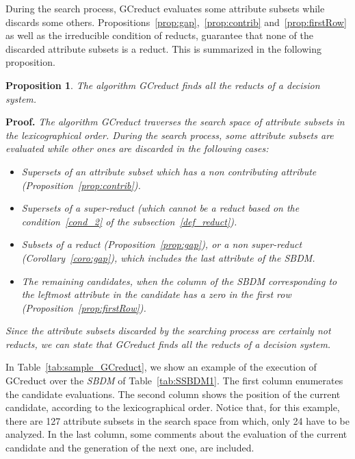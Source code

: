\documentclass[letterpaper, twoside, openright, 12pt]{book}%
\newtheorem{proposition}{Proposition}
\begin{document}
	During the search process, GCreduct evaluates some attribute subsets while discards some others. Propositions~\ref{prop:gap},~\ref{prop:contrib} and~\ref{prop:firstRow} as well as the irreducible condition of reducts, guarantee that none of the discarded attribute subsets is a reduct. This is summarized in the following proposition.
		
	\begin{proposition}\label{prop:findall}
		The algorithm GCreduct finds all the reducts of a decision system.
	\end{proposition}
		
	\noindent
	\textbf{Proof.} \textit{The algorithm GCreduct traverses the search space of attribute subsets in the lexicographical order. During the search process, some attribute subsets are evaluated while other ones are discarded in the following cases:}
		\begin{itemize}
			\item \textit{Supersets of an attribute subset which has a non contributing attribute (Proposition~\ref{prop:contrib}).}
			\item \textit{Supersets of a super-reduct (which cannot be a reduct based on the condition~\ref{cond_2} of the subsection~\ref{def_reduct}).}
			\item \textit{Subsets of a reduct (Proposition~\ref{prop:gap}), or a non super-reduct (Corollary~\ref{coro:gap}), which includes the last attribute of the \textit{SBDM}.}
			\item \textit{The remaining candidates, when the column of the \textit{SBDM} corresponding to the leftmost attribute in the candidate has a zero in the first row (Proposition~\ref{prop:firstRow}).}
		\end{itemize} 
	\textit{Since the attribute subsets discarded by the searching process are certainly not reducts, we can state that GCreduct finds all the reducts of a decision system.}
	
	In Table~\ref{tab:sample_GCreduct}, we show an example of the execution of GCreduct over the \textit{SBDM} of Table~\ref{tab:SSBDM1}. The first column enumerates the candidate evaluations. The second column shows the position of the current candidate, according to the lexicographical order. Notice that, for this example, there are 127 attribute subsets in the search space from which, only 24 have to be analyzed. In the last column, some comments about the evaluation of the current candidate and the generation of the next one, are included.
		
\end{document}
